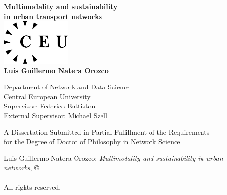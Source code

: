 \documentclass[a4paper,twoside,12pt]{book}
\begin{document}
\begin{titlepage}
	\begin{center}

		\textbf{\LARGE{Multimodality and sustainability \\ in urban transport networks}}\\[3.3cm] %

		\includegraphics[width=3.45cm,height=2.3cm]{images/ceulogo.eps}\\[3.4cm]
		{\Large{\textbf{Luis Guillermo Natera Orozco}}}\\[0.4cm]

		\medskip

		Department of Network and Data Science \\
		Central European University\\ [1.2cm]

		Supervisor: Federico Battiston \\
		External Supervisor: Michael Szell

		\vfill

		A Dissertation Submitted in Partial Fulfillment of the Requirements\\ for the Degree of Doctor of Philosophy in Network Science\\[2cm]


		\vspace{1.0cm}
		\the\year
	\end{center}
\end{titlepage}

\newpage

\pagestyle{empty}

\mbox{}

\vfill

\noindent Luis Guillermo Natera Orozco: \emph{Multimodality and sustainability in urban networks}, \copyright \\
\the\year \\ All rights reserved.
\end{document}
